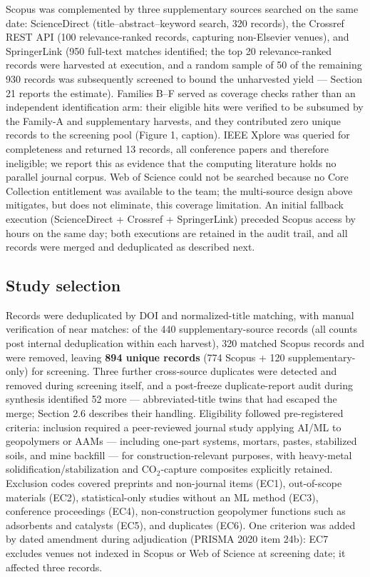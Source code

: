 \documentclass[pdflatex,sn-basic]{sn-jnl}
\begin{document}
Scopus was complemented by three supplementary sources searched on the same date: ScienceDirect (title--abstract--keyword search, 320 records), the Crossref REST API (100 relevance-ranked records, capturing non-Elsevier venues), and SpringerLink (950 full-text matches identified; the top 20 relevance-ranked records were harvested at execution, and a random sample of 50 of the remaining 930 records was subsequently screened to bound the unharvested yield --- Section 21 reports the estimate). Families B--F served as coverage checks rather than an independent identification arm: their eligible hits were verified to be subsumed by the Family-A and supplementary harvests, and they contributed zero unique records to the screening pool (Figure 1, caption). IEEE Xplore was queried for completeness and returned 13 records, all conference papers and therefore ineligible; we report this as evidence that the computing literature holds no parallel journal corpus. Web of Science could not be searched because no Core Collection entitlement was available to the team; the multi-source design above mitigates, but does not eliminate, this coverage limitation. An initial fallback execution (ScienceDirect + Crossref + SpringerLink) preceded Scopus access by hours on the same day; both executions are retained in the audit trail, and all records were merged and deduplicated as described next.

\subsection{Study selection}

Records were deduplicated by DOI and normalized-title matching, with manual verification of near matches: of the 440 supplementary-source records (all counts post internal deduplication within each harvest), 320 matched Scopus records and were removed, leaving \textbf{894 unique records} (774 Scopus + 120 supplementary-only) for screening. Three further cross-source duplicates were detected and removed during screening itself, and a post-freeze duplicate-report audit during synthesis identified 52 more --- abbreviated-title twins that had escaped the merge; Section 2.6 describes their handling. Eligibility followed pre-registered criteria: inclusion required a peer-reviewed journal study applying AI/ML to geopolymers or AAMs --- including one-part systems, mortars, pastes, stabilized soils, and mine backfill --- for construction-relevant purposes, with heavy-metal solidification/stabilization and CO$_2$-capture composites explicitly retained. Exclusion codes covered preprints and non-journal items (EC1), out-of-scope materials (EC2), statistical-only studies without an ML method (EC3), conference proceedings (EC4), non-construction geopolymer functions such as adsorbents and catalysts (EC5), and duplicates (EC6). One criterion was added by dated amendment during adjudication (PRISMA 2020 item 24b): EC7 excludes venues not indexed in Scopus or Web of Science at screening date; it affected three records.
\end{document}

